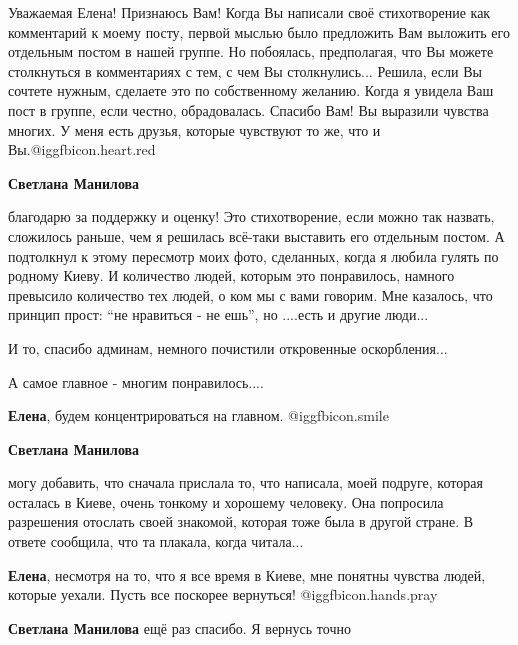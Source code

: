 \begin{itemize}

Уважаемая Елена! Признаюсь Вам! Когда Вы написали своё стихотворение как
комментарий к моему посту, первой мыслью было предложить Вам выложить его
отдельным постом в нашей группе. Но побоялась, предполагая, что Вы можете
столкнуться в комментариях с тем, с чем Вы столкнулись... Решила, если Вы
сочтете нужным, сделаете это по собственному желанию. Когда я увидела Ваш пост
в группе, если честно, обрадовалась. Спасибо Вам! Вы выразили чувства многих. У
меня есть друзья, которые чувствуют то же, что и Вы.@igg{fbicon.heart.red}

\begin{itemize} %
\textbf{Светлана Манилова} 

благодарю за поддержку и оценку! Это стихотворение, если можно так назвать,
сложилось раньше, чем я решилась всё-таки выставить его отдельным постом. А
подтолкнул к этому пересмотр моих фото, сделанных, когда я любила гулять по
родному Киеву. И количество людей, которым это понравилось, намного превысило
количество тех людей, о ком мы с вами говорим. Мне казалось, что принцип
прост: \enquote{не нравиться - не ешь}, но ....есть и другие люди...

И то, спасибо админам, немного почистили откровенные оскорбления...

А самое главное - многим понравилось....

\begin{itemize} %
\textbf{Елена}, будем концентрироваться на главном. @igg{fbicon.smile} 

\textbf{Светлана Манилова} 

могу добавить, что сначала прислала то, что написала, моей подруге, которая
осталась в Киеве, очень тонкому и хорошему человеку. Она попросила разрешения
отослать своей знакомой, которая тоже была в другой стране. В ответе сообщила,
что та плакала, когда читала...

\textbf{Елена}, несмотря на то, что я все время в Киеве, мне понятны чувства людей, которые уехали. Пусть все поскорее вернуться! @igg{fbicon.hands.pray} 

\textbf{Светлана Манилова} ещё раз спасибо. Я вернусь точно
\end{itemize} %

\end{itemize} %


\end{itemize} %
